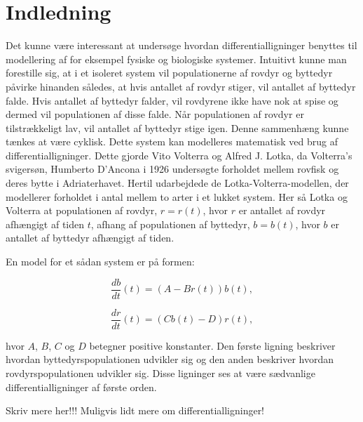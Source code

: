 \chapter{Indledning}

Det kunne være interessant at undersøge hvordan differentialligninger benyttes til modellering af for eksempel fysiske og biologiske systemer. Intuitivt kunne man forestille sig, at i et isoleret system vil populationerne af rovdyr og byttedyr påvirke hinanden således, at hvis antallet af rovdyr stiger, vil antallet af byttedyr falde. Hvis antallet af byttedyr falder, vil rovdyrene ikke have nok at spise og dermed vil populationen af disse falde. Når populationen af rovdyr er tilstrækkeligt lav, vil antallet af byttedyr stige igen. Denne sammenhæng kunne tænkes at være cyklisk. 
Dette system kan modelleres matematisk ved brug af differentialligninger. Dette gjorde Vito Volterra og Alfred J. Lotka, da Volterra’s svigersøn, Humberto D'Ancona i 1926 undersøgte forholdet mellem rovfisk og deres bytte i Adriaterhavet. Hertil udarbejdede de Lotka-Volterra-modellen, der modellerer forholdet i antal mellem to arter i et lukket system. 
Her så Lotka og Volterra at populationen af rovdyr, $r=r(t)$, hvor $r$ er antallet af rovdyr afhængigt af tiden $t$, afhang af populationen af byttedyr, $b=b(t)$, hvor $b$ er antallet af byttedyr afhængigt af tiden. 

\hfill \break
En model for et sådan system er på formen: 

\begin{equation*}
    \dfrac{db}{dt}(t) = (A-Br(t)) b(t), 
\end{equation*}

\begin{equation*}
    \dfrac{dr}{dt}(t) = (Cb(t)-D) r(t),
\end{equation*}

\hfill \break
hvor $A$, $B$, $C$ og $D$ betegner positive konstanter. Den første ligning beskriver hvordan byttedyrspopulationen udvikler sig og den anden beskriver hvordan rovdyrspopulationen udvikler sig. Disse ligninger ses at være sædvanlige differentialligninger af første orden. 

Skriv mere her!!! Muligvis lidt mere om differentialligninger!




